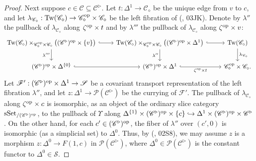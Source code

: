 \documentclass{tac}
\newcommand{\s}[1]{\mathscr{#1}}
\newcommand{\tx}[1]{\textnormal{#1}}
\newcommand{\ul}[1]{\underline{#1}}
\begin{document}
\begin{proof}
\hfill

Next suppose $c\in \s{C} \subseteq \s{C}^\triangleright$.  Let $t : \Delta^1 \to \s{C}_\diamond$ be the unique edge from $v$ to $c$, and let $\lambda_{\s{C}_\diamond} : \tx{Tw}(\s{C}_\diamond ) \to \s{C}_\diamond^\tx{op} \times \s{C}_\diamond$ be the left fibration of (\cite{kerodon}, 03JK).  Denote by $\lambda''$ the pullback of $\lambda_{\s{C}_\diamond}$ along $\zeta^\tx{op} \times t$ and by $\lambda'''$ the pullback of $\lambda_{\s{C}_\diamond}$ along $\zeta^\tx{op} \times v$:
\[\begin{tikzcd}
 \tx{Tw}(\s{C}_\diamond )\times_{\s{C}_\diamond^\tx{op} \times \s{C}_\diamond} \big( (\s{C}^\triangleright )^\tx{op} \times \{ v\} \big) \arrow[hook]{r} \arrow[]{d}[swap]{\lambda'''} & \tx{Tw}(\s{C}_\diamond )\times_{\s{C}_\diamond^\tx{op} \times \s{C}_\diamond} \big( (\s{C}^\triangleright )^\tx{op} \times \Delta^1 \big) \arrow[hook]{r} \arrow[]{d}[swap]{\lambda''} & \tx{Tw}(\s{C}_\diamond ) \arrow[]{d}{\lambda_{\s{C}_\diamond}} \\
(\s{C}^\triangleright )^\tx{op} \times \Delta^{\{0\}} \arrow[hook]{r} & (\s{C}^\triangleright )^\tx{op} \times \Delta^1 \arrow[hook]{r}[swap]{\zeta^\tx{op} \times t} & \s{C}_\diamond^\tx{op} \times \s{C}_\diamond .
\end{tikzcd}\]
Let $\s{F}' : (\s{C}^\triangleright )^\tx{op} \times \Delta^1 \to \s{S}$ be a covariant transport representation of the left fibration $\lambda''$, and let $z : \Delta^1 \to \s{P}(\s{C}^\triangleright )$ be the currying of $\s{F}'$.  The pullback of $\lambda_{\s{C}_\diamond }$ along $\zeta^\tx{op} \times c$ is isomorphic, as an object of the ordinary slice category $\tx{sSet}_{/(\s{C}^\triangleright )^\tx{op}}$, to the pullback of $\Upsilon$ along $\Delta^{\{1\}} \times (\s{C}^\triangleright )^\tx{op} \times \{c \} \hookrightarrow \Delta^1 \times (\s{C}^\triangleright )^\tx{op} \times \s{C}^\triangleright$.  On the other hand, for each $c' \in (\s{C}^\triangleright )^\tx{op}$, the fiber of $\lambda''$ over $(c',0)$ is isomorphic (as a simplicial set) to $\Delta^0$.  Thus, by (\cite{kerodon}, 02S8), we may assume $z$ is a morphism $z : \ul{\Delta}^0 \to F(1,c)$ in $\s{P}(\s{C}^\triangleright )$, where $\ul{\Delta}^0 \in \s{P}(\s{C}^\triangleright )$ is the constant functor to $\Delta^0 \in \s{S}$. 


\end{proof}
\end{document}
